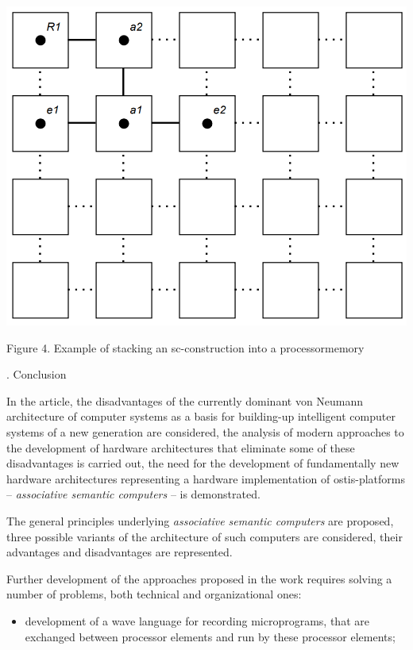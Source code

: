 \documentclass{article}
\begin{document}
{\begin{multicols}{2}
\begin{center}
    \includegraphics[scale=0.32]{images/abobus.png}
\end{center}
\vspace{+5pt}
{\small Figure 4. Example of stacking an sc-construction into a processormemory}


\begin{center}
    \vspace{+6pt}
    {\large {}. Conclusion}
\end{center}

\vspace{-2pt}
In the article, the disadvantages of the currently
dominant von Neumann architecture of computer systems
as a basis for building-up intelligent computer systems of
a new generation are considered, the analysis of modern
approaches to the development of hardware architectures
that eliminate some of these disadvantages is carried
out, the need for the development of fundamentally
new hardware architectures representing a hardware
implementation of ostis-platforms – \textit{associative semantic
computers} – is demonstrated.

The general principles underlying \textit{associative semantic
computers} are proposed, three possible variants of the
architecture of such computers are considered, their
advantages and disadvantages are represented.

Further development of the approaches proposed in
the work requires solving a number of problems, both
technical and organizational ones:
\vspace{+3pt}
\begin{itemize}
    \item development of a wave language for recording microprograms, that are exchanged between processor
    elements and run by these processor elements;
    

\end{itemize}
\end{multicols}}
\end{document}
